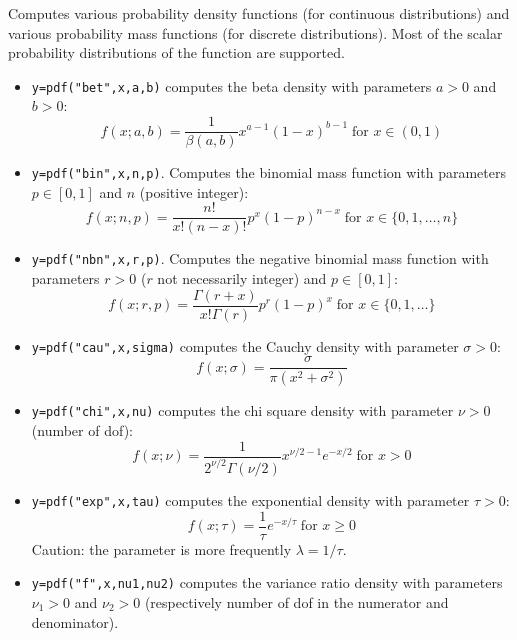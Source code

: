 \begin{mandescription}
  Computes various probability density functions (for continuous
  distributions) 
  and various probability mass functions (for discrete distributions). Most of the
  scalar probability distributions of the 
  function are supported. 
\begin{itemize}

\item {} \verb!y=pdf("bet",x,a,b)! computes the beta
  density with parameters $a > 0$ and $b > 0$:
$$
     f(x; a, b) =
        \frac{1}{\beta(a,b)} x^{a-1}(1-x)^{b-1} \;
        \mbox{for } x \in (0,1)
$$

\item {} \verb!y=pdf("bin",x,n,p)!. Computes
  the binomial mass function with parameters $p \in [0,1]$ and $n$
  (positive integer):
$$
     f(x; n, p) = \frac{ n! }{ x! (n-x)!} p^x (1-p)^{n-x} \;\mbox{for } x \in \{0,1,\dots,n\}
$$

\item {} \verb!y=pdf("nbn",x,r,p)!. Computes
  the negative binomial mass function with parameters $r > 0$ ($r$ not
  necessarily integer) and $p \in [0,1]$:
$$
     f(x; r, p) = \frac{ \Gamma(r+x) }{ x! \Gamma(r)} p^r (1-p)^x \;\mbox{for } x \in \{0,1,\dots\}
$$


\item {} \verb!y=pdf("cau",x,sigma)! computes the Cauchy
  density with parameter $\sigma > 0$:
$$
     f(x; \sigma) = \frac{ \sigma }{ \pi ( x^2 + \sigma^2 ) }
$$


\item {} \verb!y=pdf("chi",x,nu)! computes the chi square
  density with parameter $\nu > 0$ (number of dof):
$$
     f(x; \nu) = \frac{1}{2^{\nu/2} \Gamma(\nu/2)} x^{\nu/2-1} e^{-x/2}\; \mbox{for } x > 0 
$$


\item {} \verb!y=pdf("exp",x,tau)! computes the exponential
  density with parameter $\tau > 0$:
$$
     f(x; \tau) = \frac{1}{\tau} e^{-x/\tau} \; \mbox{for } x
     \ge 0
$$
Caution: the parameter is more frequently $\lambda = 1/\tau$.


\item {} \verb!y=pdf("f",x,nu1,nu2)! computes
  the variance ratio density with parameters $\nu_1 > 0$ and $\nu_2 >
  0$ (respectively number of dof in the numerator and denominator).



\end{itemize}
\end{mandescription}
